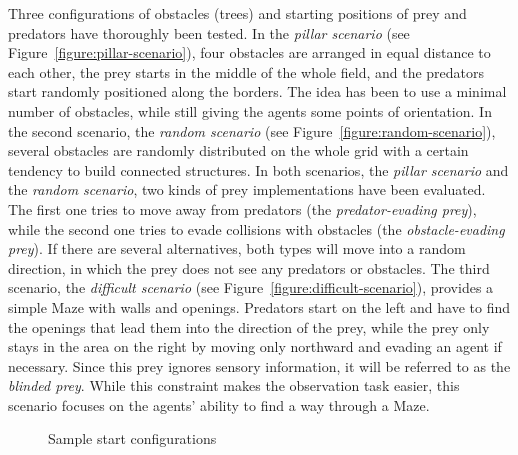 Three configurations of obstacles (trees) and star\-ting positions of prey and predators have thoroughly been tested. In the \emph{pillar scenario} (see Figure~\ref{figure:pillar-scenario}), four obstacles are arranged in equal distance to each other, the prey starts in the middle of the whole field, and the predators start randomly positioned along the borders. The idea %
has been to use a minimal number of obstacles, while still giving the agents some points of orientation.
In the second scenario, the \emph{random scenario} (see Figure~\ref{figure:random-scenario}), several obstacles are randomly distributed on the whole grid with a certain tendency to build connected structures. In both scenarios, the \emph{pillar scenario} and the \emph{random scenario}, two kinds of prey implementations have been evaluated. The first one tries to move away from predators (the \emph{predator-evading prey}), while the second one tries to evade collisions with obstacles (the \emph{obstacle-evading prey}). %
If there are several alternatives, both types will move into a random direction, in which the prey does not see any predators or obstacles. The third scenario, the \emph{difficult scenario} (see Figure~\ref{figure:difficult-scenario}), provides a simple Maze with walls and openings. Predators start on the left and have to find the openings that lead them into the direction of the prey, while the prey only stays in the area on the right by moving only northward and evading an agent if necessary. %
Since this prey ignores sensory information, it will be referred to as the \emph{blinded prey}. While this constraint makes the observation task easier, this scenario focuses on the agents' ability to find a way through a Maze. %

\begin{figure}[ht]
	\hfill
  \hfill
  \caption{Sample start configurations} %
  \label{figure:scenarios}
\end{figure}




